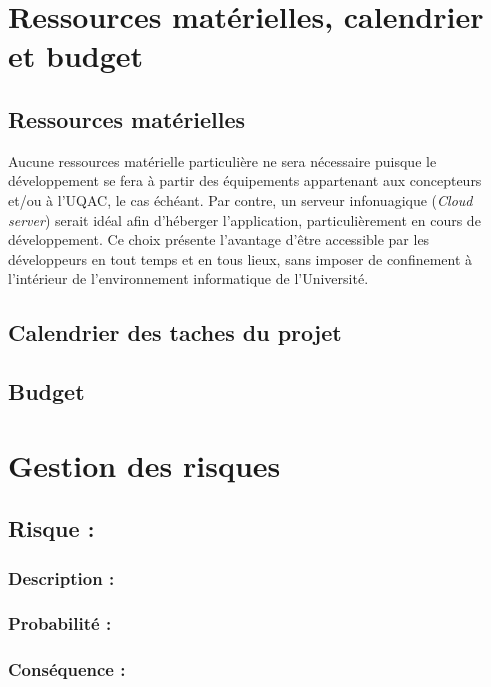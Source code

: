 \documentclass[12pt]{article}
\begin{document}
\section{Ressources matérielles, calendrier et budget}

\subsection{Ressources matérielles}

Aucune ressources matérielle particulière ne sera nécessaire puisque le développement se fera à partir des équipements appartenant aux concepteurs et/ou à l'UQAC, le cas échéant.  Par contre, un serveur infonuagique (\textit{Cloud server}) serait idéal afin d'héberger l'application, particulièrement en cours de développement.  Ce choix présente l'avantage d'être accessible par les développeurs en tout temps et en tous lieux, sans imposer de confinement à l'intérieur de l'environnement informatique de l'Université.

\subsection{Calendrier des taches du projet}

\subsection{Budget}

\newpage

\section{Gestion des risques}


\subsection{Risque :}

\subsubsection*{Description :}

\subsubsection*{Probabilité :}

\subsubsection*{Conséquence :}
\end{document}
